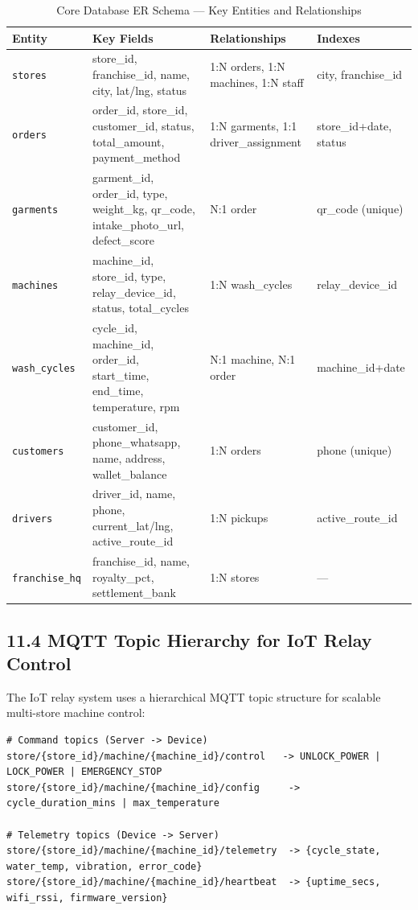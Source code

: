 \documentclass[11pt,a4paper]{article}
\begin{document}
\begin{table}[h!]
\centering
\scriptsize
\begin{tabularx}{\textwidth}{XXXX}
\toprule
\textbf{Entity} & \textbf{Key Fields} & \textbf{Relationships} & \textbf{Indexes} \\
\midrule
\texttt{stores} & store\_id, franchise\_id, name, city, lat/lng, status & 1:N orders, 1:N machines, 1:N staff & city, franchise\_id \\
\texttt{orders} & order\_id, store\_id, customer\_id, status, total\_amount, payment\_method & 1:N garments, 1:1 driver\_assignment & store\_id+date, status \\
\texttt{garments} & garment\_id, order\_id, type, weight\_kg, qr\_code, intake\_photo\_url, defect\_score & N:1 order & qr\_code (unique) \\
\texttt{machines} & machine\_id, store\_id, type, relay\_device\_id, status, total\_cycles & 1:N wash\_cycles & relay\_device\_id \\
\texttt{wash\_cycles} & cycle\_id, machine\_id, order\_id, start\_time, end\_time, temperature, rpm & N:1 machine, N:1 order & machine\_id+date \\
\texttt{customers} & customer\_id, phone\_whatsapp, name, address, wallet\_balance & 1:N orders & phone (unique) \\
\texttt{drivers} & driver\_id, name, phone, current\_lat/lng, active\_route\_id & 1:N pickups & active\_route\_id \\
\texttt{franchise\_hq} & franchise\_id, name, royalty\_pct, settlement\_bank & 1:N stores & --- \\
\bottomrule
\end{tabularx}
\caption{Core Database ER Schema --- Key Entities and Relationships}
\end{table}

\subsection{11.4 MQTT Topic Hierarchy for IoT Relay Control}
The IoT relay system uses a hierarchical MQTT topic structure for scalable multi-store machine control:

\begin{lstlisting}
# Command topics (Server -> Device)
store/{store_id}/machine/{machine_id}/control   -> UNLOCK_POWER | LOCK_POWER | EMERGENCY_STOP
store/{store_id}/machine/{machine_id}/config     -> cycle_duration_mins | max_temperature

# Telemetry topics (Device -> Server)  
store/{store_id}/machine/{machine_id}/telemetry  -> {cycle_state, water_temp, vibration, error_code}
store/{store_id}/machine/{machine_id}/heartbeat  -> {uptime_secs, wifi_rssi, firmware_version}
\end{lstlisting}
\end{document}
